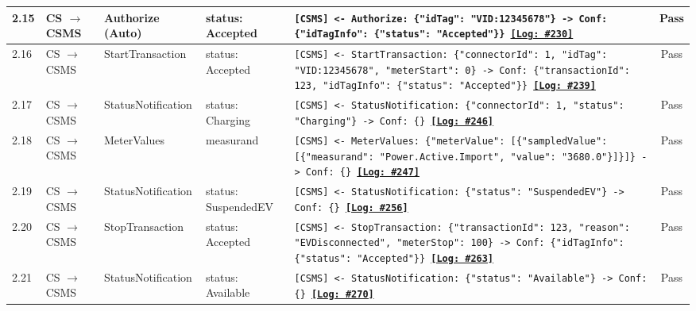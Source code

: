 \documentclass[10pt, a4paper, landscape]{article}
\begin{document}
\begin{longtable}{|p{1.0cm}|p{2.5cm}|p{4.0cm}|p{5.0cm}|p{10.0cm}|c|}
\hline
2.15 & CS $\to$ CSMS & Authorize (Auto) & status: Accepted & \footnotesize\texttt{[CSMS] <- Authorize: \{"idTag": "VID:12345678"\} \newline [CSMS] -> Conf: \{"idTagInfo": \{"status": "Accepted"\}\} \newline \hyperref[log:2.15]{\textbf{[Log: \#230]}}} & Pass \\
\hline
2.16 & CS $\to$ CSMS & StartTransaction & status: Accepted & \footnotesize\texttt{[CSMS] <- StartTransaction: \{"connectorId": 1, "idTag": "VID:12345678", "meterStart": 0\} \newline [CSMS] -> Conf: \{"transactionId": 123, "idTagInfo": \{"status": "Accepted"\}\} \newline \hyperref[log:2.16]{\textbf{[Log: \#239]}}} & Pass \\
\hline
2.17 & CS $\to$ CSMS & StatusNotification & status: Charging & \footnotesize\texttt{[CSMS] <- StatusNotification: \{"connectorId": 1, "status": "Charging"\} \newline [CSMS] -> Conf: \{\} \newline \hyperref[log:2.17]{\textbf{[Log: \#246]}}} & Pass \\
\hline
2.18 & CS $\to$ CSMS & MeterValues & measurand & \footnotesize\texttt{[CSMS] <- MeterValues: \{"meterValue": [\{"sampledValue": [\{"measurand": "Power.Active.Import", "value": "3680.0"\}]\}]\} \newline [CSMS] -> Conf: \{\} \newline \hyperref[log:2.18]{\textbf{[Log: \#247]}}} & Pass \\
\hline
2.19 & CS $\to$ CSMS & StatusNotification & status: SuspendedEV & \footnotesize\texttt{[CSMS] <- StatusNotification: \{"status": "SuspendedEV"\} \newline [CSMS] -> Conf: \{\} \newline \hyperref[log:2.19]{\textbf{[Log: \#256]}}} & Pass \\
\hline
2.20 & CS $\to$ CSMS & StopTransaction & status: Accepted & \footnotesize\texttt{[CSMS] <- StopTransaction: \{"transactionId": 123, "reason": "EVDisconnected", "meterStop": 100\} \newline [CSMS] -> Conf: \{"idTagInfo": \{"status": "Accepted"\}\} \newline \hyperref[log:2.20]{\textbf{[Log: \#263]}}} & Pass \\
\hline
2.21 & CS $\to$ CSMS & StatusNotification & status: Available & \footnotesize\texttt{[CSMS] <- StatusNotification: \{"status": "Available"\} \newline [CSMS] -> Conf: \{\} \newline \hyperref[log:2.21]{\textbf{[Log: \#270]}}} & Pass \\
\hline


\end{longtable}
\end{document}
